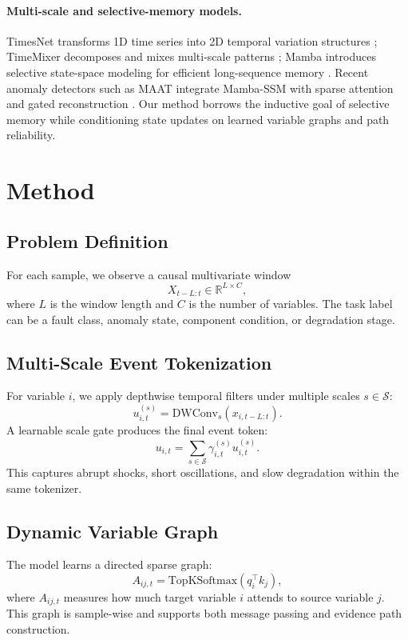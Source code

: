 \documentclass[letterpaper]{article}
\begin{document}
\paragraph{Multi-scale and selective-memory models.}
TimesNet transforms 1D time series into 2D temporal variation structures \citep{wu2023timesnet}; TimeMixer decomposes and mixes multi-scale patterns \citep{wang2024timemixer}; Mamba introduces selective state-space modeling for efficient long-sequence memory \citep{gu2024mamba}. Recent anomaly detectors such as MAAT integrate Mamba-SSM with sparse attention and gated reconstruction \citep{sellam2025maat}. Our method borrows the inductive goal of selective memory while conditioning state updates on learned variable graphs and path reliability.

\section{Method}

\subsection{Problem Definition}

For each sample, we observe a causal multivariate window
\[
X_{t-L:t} \in \mathbb{R}^{L \times C},
\]
where \(L\) is the window length and \(C\) is the number of variables. The task label can be a fault class, anomaly state, component condition, or degradation stage.

\subsection{Multi-Scale Event Tokenization}

For variable \(i\), we apply depthwise temporal filters under multiple scales \(s \in \mathcal{S}\):
\[
u_{i,t}^{(s)} = \text{DWConv}_{s}(x_{i,t-L:t}).
\]
A learnable scale gate produces the final event token:
\[
u_{i,t} = \sum_{s \in \mathcal{S}} \gamma_{i,t}^{(s)} u_{i,t}^{(s)}.
\]
This captures abrupt shocks, short oscillations, and slow degradation within the same tokenizer.

\subsection{Dynamic Variable Graph}

The model learns a directed sparse graph:
\[
A_{ij,t} = \text{TopKSoftmax}(q_i^\top k_j),
\]
where \(A_{ij,t}\) measures how much target variable \(i\) attends to source variable \(j\). This graph is sample-wise and supports both message passing and evidence path construction.
\end{document}
